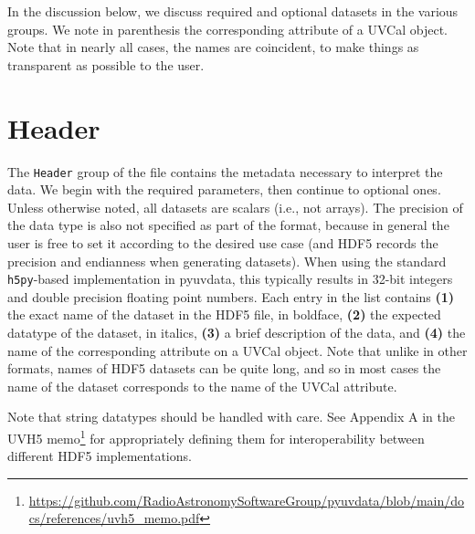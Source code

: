 \documentclass[11pt, oneside]{article}
\begin{document}
In the discussion below, we discuss required and optional datasets in the
various groups. We note in parenthesis the corresponding attribute of a UVCal
object. Note that in nearly all cases, the names are coincident, to make things
as transparent as possible to the user.

\section{Header}
\label{sec:header}
The \texttt{Header} group of the file contains the metadata necessary to interpret
the data. We begin with the required parameters, then continue to optional
ones. Unless otherwise noted, all datasets are scalars (i.e., not arrays). The
precision of the data type is also not specified as part of the format, because
in general the user is free to set it according to the desired use case (and
HDF5 records the precision and endianness when generating datasets). When using
the standard \texttt{h5py}-based implementation in pyuvdata, this typically
results in 32-bit integers and double precision floating point numbers. Each
entry in the list contains \textbf{(1)} the exact name of the dataset in the
HDF5 file, in boldface, \textbf{(2)} the expected datatype of the dataset, in
italics, \textbf{(3)} a brief description of the data, and \textbf{(4)} the name
of the corresponding attribute on a UVCal object. Note that unlike in other
formats, names of HDF5 datasets can be quite long, and so in most cases the name
of the dataset corresponds to the name of the UVCal attribute.

Note that string datatypes should be handled with care. See
Appendix A in the UVH5 memo\footnote{\url{https://github.com/RadioAstronomySoftwareGroup/pyuvdata/blob/main/docs/references/uvh5_memo.pdf}}
for appropriately defining them for interoperability between different HDF5
implementations.
\end{document}
